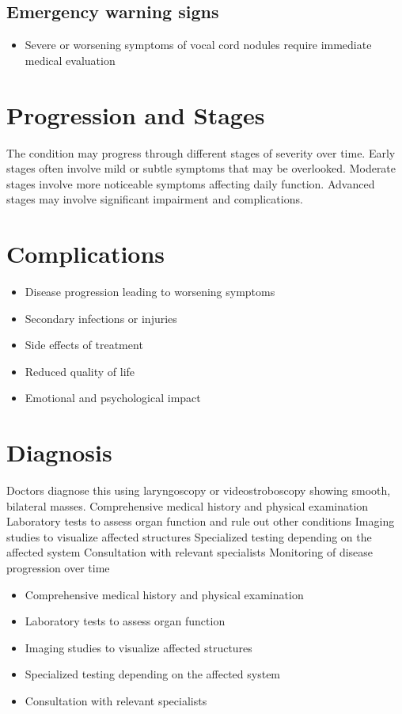 \subsection{Emergency warning signs}
\begin{itemize}[noitemsep]
  \item Severe or worsening symptoms of vocal cord nodules require immediate medical evaluation
\end{itemize}
\section{Progression and Stages}
The condition may progress through different stages of severity over time. Early stages often involve mild or subtle symptoms that may be overlooked. Moderate stages involve more noticeable symptoms affecting daily function. Advanced stages may involve significant impairment and complications.
\section{Complications}
\begin{itemize}[noitemsep]
  \item Disease progression leading to worsening symptoms
  \item Secondary infections or injuries
  \item Side effects of treatment
  \item Reduced quality of life
  \item Emotional and psychological impact
\end{itemize}
\section{Diagnosis}
Doctors diagnose this using laryngoscopy or videostroboscopy showing smooth, bilateral masses. Comprehensive medical history and physical examination Laboratory tests to assess organ function and rule out other conditions Imaging studies to visualize affected structures Specialized testing depending on the affected system Consultation with relevant specialists Monitoring of disease progression over time

\begin{itemize}[noitemsep]
  \item Comprehensive medical history and physical examination
  \item Laboratory tests to assess organ function
  \item Imaging studies to visualize affected structures
  \item Specialized testing depending on the affected system
  \item Consultation with relevant specialists
\end{itemize}
